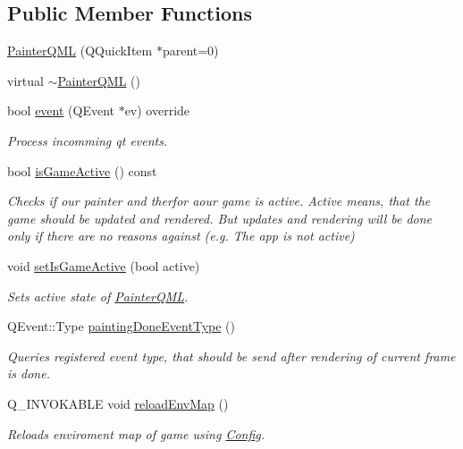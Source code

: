 \subsection*{Public Member Functions}
\begin{DoxyCompactItemize}
\item 
\hyperlink{class_painter_q_m_l_a6ce68afc41c75b1fc74da16890d9f797}{Painter\+Q\+M\+L} (Q\+Quick\+Item $\ast$parent=0)
\item 
virtual \hyperlink{class_painter_q_m_l_a2d0bd68f4b501927f65ec5ff2a06da64}{$\sim$\+Painter\+Q\+M\+L} ()
\item 
bool \hyperlink{class_painter_q_m_l_a69fecccc6056c3ee957219ffd63c193c}{event} (Q\+Event $\ast$ev) override
\begin{DoxyCompactList}\small\item\em Process incomming qt events. \end{DoxyCompactList}\item 
bool \hyperlink{class_painter_q_m_l_aad209e5ccfa2a6aa2a5dcd6148befb5b}{is\+Game\+Active} () const 
\begin{DoxyCompactList}\small\item\em Checks if our painter and therfor aour game is active.  Active means, that the game should be updated and rendered. But updates and rendering will be done only if there are no reasons against (e.\+g. The app is not active) \end{DoxyCompactList}\item 
void \hyperlink{class_painter_q_m_l_a303f544708d2041bc25e75db52e89736}{set\+Is\+Game\+Active} (bool active)
\begin{DoxyCompactList}\small\item\em Sets active state of \hyperlink{class_painter_q_m_l}{Painter\+Q\+M\+L}. \end{DoxyCompactList}\item 
Q\+Event\+::\+Type \hyperlink{class_painter_q_m_l_a7715bb2f3d638ff3d5e6e602a427b413}{painting\+Done\+Event\+Type} ()
\begin{DoxyCompactList}\small\item\em Queries registered event type, that should be send after rendering of current frame is done. \end{DoxyCompactList}\item 
Q\+\_\+\+I\+N\+V\+O\+K\+A\+B\+L\+E void \hyperlink{class_painter_q_m_l_a3dede2a01c6e90c51c9bfe69ac0d83bd}{reload\+Env\+Map} ()
\begin{DoxyCompactList}\small\item\em Reloads enviroment map of game using \hyperlink{class_config}{Config}. \end{DoxyCompactList}\item 

\end{DoxyCompactItemize}
